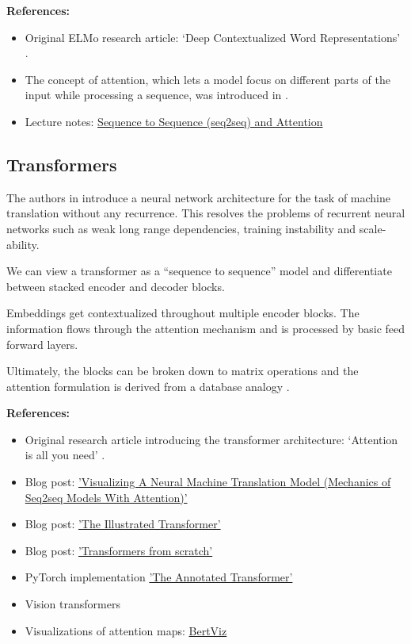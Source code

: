 \documentclass[11pt, a4paper]{amsart}
\begin{document}
\noindent \textbf{References:}
\begin{itemize}
	\item {Original ELMo research article:} `Deep Contextualized Word Representations' \cite{DBLP:journals/corr/abs-1802-05365}.
	\item The concept of attention, which lets a model focus on different parts of the input while processing a sequence, was introduced in \cite{garg-etal-2019-jointly}.
	\item Lecture notes: \href{https://lena-voita.github.io/nlp_course/seq2seq_and_attention.html}{Sequence to Sequence (seq2seq) and Attention}
\end{itemize}

\subsection{Transformers}

The authors in \cite{DBLP:journals/corr/VaswaniSPUJGKP17} introduce a neural network architecture for the task of machine translation without any recurrence. 
This resolves the problems of recurrent neural networks such as weak long range dependencies, training instability and scale-ability.

We can view a transformer as a ``sequence to sequence'' model and differentiate between stacked encoder and decoder blocks.

Embeddings get contextualized throughout multiple encoder blocks.
The information flows through the attention mechanism and is processed by basic feed forward layers. 

Ultimately, the blocks can be broken down to matrix operations and the attention formulation is derived from a database analogy \cite{pmlr-v139-schlag21a}.

\noindent \textbf{References:}
\begin{itemize}
	\item {Original research article introducing the transformer architecture:} `Attention is all you need' \cite{DBLP:journals/corr/VaswaniSPUJGKP17}.
	\item Blog post:
	\href{https://jalammar.github.io/visualizing-neural-machine-translation-mechanics-of-seq2seq-models-with-attention/}{'Visualizing A Neural Machine Translation Model (Mechanics of Seq2seq Models With Attention)'}
	\item Blog post:
	\href{https://jalammar.github.io/illustrated-transformer/}{'The Illustrated Transformer'}
	\item Blog post:
	\href{http://peterbloem.nl/blog/transformers}{'Transformers from scratch'}
	\item PyTorch implementation \href{https://nlp.seas.harvard.edu/2018/04/03/attention.html}{'The Annotated Transformer'}
	\item Vision transformers \cite{dosovitskiy2021an}
	\item Visualizations of attention maps:
	\href{https://github.com/jessevig/bertviz}{BertViz}
\end{itemize}
\end{document}
